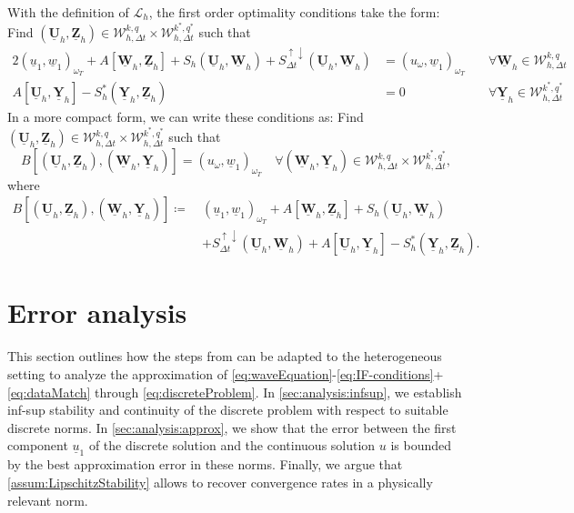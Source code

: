\documentclass[sn-mathphys-num]{sn-jnl}
\numberwithin{equation}{section}
\newcommand{\cL}{\mathcal{L}}
\newcommand{\ProdFullyDiscrSpace}[2]{ \mathcal{W}^{ {#1},{#2}}_{h, \Delta t  } }
\newcommand{\Uh}{\underline{\mathbf{U}}_h}
\newcommand{\Yh}{\underline{\mathbf{Y}}_h}
\newcommand{\Zh}{\underline{\mathbf{Z}}_h}
\newcommand{\Wh}{\underline{\mathbf{W}}_h}
\newcommand{\ul}{\underline{u}}
\newcommand{\wl}{\underline{w}}
\newcommand{\Sud}{S^{\uparrow \downarrow}_{\Delta t}}
\begin{document}
 With the definition of $\cL_h$, the first order optimality conditions take the form: Find $(\Uh,\Zh) \in \ProdFullyDiscrSpace{k}{q} \times \ProdFullyDiscrSpace{k^\ast}{q^\ast}$ such that 
\begin{alignat*}{2}
    (\ul_1,\wl_1)_{\omega_T} \! + \! A[\Wh,\Zh] + S_h(\Uh,\Wh) + \Sud(\Uh,\Wh) &= (u_{\omega},\wl_1)_{\omega_T} \ &&\forall \Wh \in \ProdFullyDiscrSpace{k}{q} \\
    A[\Uh,\Yh] -  S_h^\ast(\Yh,\Zh) &= 0 \ &&\forall \Yh \in \ProdFullyDiscrSpace{k^\ast}{q^\ast} 
\end{alignat*}
In a more compact form, we can write these conditions as: Find $(\Uh,\Zh) \in \ProdFullyDiscrSpace{k}{q} \times \ProdFullyDiscrSpace{k^\ast}{q^\ast}$ such that
\begin{equation}\label{eq:discreteProblem}
    B[(\Uh,\Zh),(\Wh,\Yh)] = (u_{\omega},\wl_1)_{\omega_T} \quad \forall (\Wh,\Yh) \in \ProdFullyDiscrSpace{k}{q} \times \ProdFullyDiscrSpace{k^\ast}{q^\ast},
\end{equation}
where 
\begin{equation}
    \begin{aligned}
        B[(\Uh,\Zh),(\Wh,\Yh)] \coloneqq \ &(\ul_1,\wl_1)_{\omega_T} + A[\Wh,\Zh]+ S_h(\Uh,\Wh) \\
        &+  \Sud(\Uh,\Wh) + A[\Uh,\Yh] - S_h^\ast(\Yh,\Zh).
    \end{aligned}
\end{equation}

\section{Error analysis}
This section outlines how the steps from \cite{BP24} can be adapted to the heterogeneous setting to analyze the approximation of \eqref{eq:waveEquation}-\eqref{eq:IF-conditions}+\eqref{eq:dataMatch} through \eqref{eq:discreteProblem}. In \cref{sec:analysis:infsup}, we establish inf-sup stability and continuity of the discrete problem with respect to suitable discrete norms.
In \cref{sec:analysis:approx}, we show that the error between the first component $\ul_1$ of the discrete solution and the continuous solution $u$ is bounded by the best approximation error in these norms. Finally, we argue that \cref{assum:LipschitzStability} allows to recover convergence rates in a physically relevant norm. 
\end{document}
